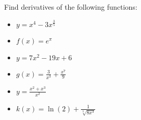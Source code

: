 Find derivatives of the following functions:
\begin{itemize}
    \item $y=x^4-3x^\frac{3}{5}$\vspace{\fill}
    \item $f(x)=e^\pi$\vspace{\fill}
    \item $y=7x^2-19x+6$\vspace{\fill}
    \item $g(x)=\frac{3}{x^3}+\frac{x^7}{9}$\vspace{\fill}
    \item $y=\frac{x^2+x^3}{x^2}$\vspace{\fill}
    \item $k(x)=\ln(2)+\frac{1}{\sqrt[3]{8x^3}}$
\end{itemize}
